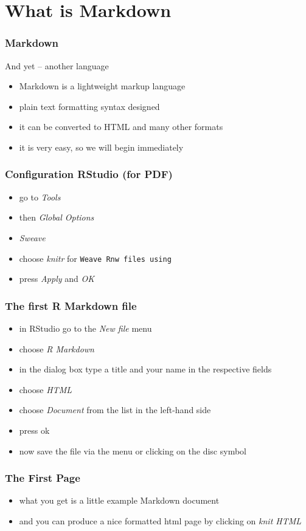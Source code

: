 \section{What is Markdown}
\label{md1}

\begin{frame}\frametitle{Markdown}
  And yet -- another language
  \begin{itemize}
  \item Markdown is a lightweight markup language
  \item plain text formatting syntax designed
  \item it can be converted to HTML and many other formats
  \item it is very easy, so we will begin immediately
  \end{itemize}
\end{frame}


\begin{frame}\frametitle{Configuration RStudio (for PDF)}
  \begin{itemize}
  \item go to \textit{Tools}
  \item then \textit{Global Options}
  \item \textit{Sweave}
  \item choose \textit{knitr} for \texttt{Weave Rnw files using}
  \item press \textit{Apply} and \textit{OK}
  \end{itemize}
\end{frame}


\begin{frame}\frametitle{The first R Markdown file}
  \begin{itemize}
  \item in RStudio go to the \textit{New file} menu
  \item choose \textit{R Markdown}
  \item in the dialog box type a title and your name in the respective fields
  \item choose \textit{HTML} 
  \item choose \textit{Document} from the list in the left-hand side
  \item press ok
  \item now save the file via the menu or clicking on the disc symbol
  \end{itemize}
\end{frame}


\begin{frame}\frametitle{The First Page}
  \begin{itemize}
  \item what you get is a little example Markdown document
  \item and you can produce a nice formatted html page by clicking on \textit{knit HTML}
  \end{itemize}
\end{frame}


